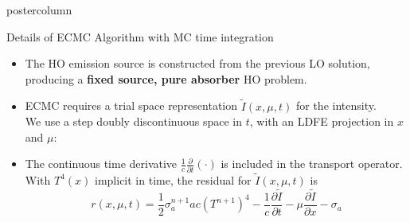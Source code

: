 \documentclass[xcolor=dvipsnames]{beamer}
\newcommand{\pderiv}[2]{\frac{\partial #1}{\partial #2}}
\newcommand{\colb}[1]{{\color{blue} #1}}
\begin{document}
\begin{frame}
\begin{columns}
\begin{column}{.49\textwidth}
\begin{beamercolorbox}[center,wd=\textwidth]{postercolumn}
\begin{minipage}[T]{0.95\textwidth}
{%
\begin{block}{Details of ECMC Algorithm with MC time integration}
    \begin{itemize}
        \setlength\itemsep{0.5em}
        \item The HO emission source is constructed from the previous LO
            solution, producing a \textbf{fixed source,
            pure absorber} HO problem. 
        \item ECMC requires a trial space representation $\tilde I(x,\mu,t)$ for the
            intensity. \\  We use a
            \colb{step doubly discontinuous} space in $t$, with an LDFE projection
            in $x$ and $\mu$:
            \vspace{0.1in}
    \begin{center}
    \end{center}
        \item The continuous time derivative $\frac{1}{c}\pderiv{}{t}\left(\cdot\right)$
            is included in the transport operator. With $T^4(x)$ implicit in time, the
            residual for $\tilde I(x,\mu,t)$ is
            \vspace{0.20in}
            \begin{equation*}
                r(x,\mu,t) = \frac{1}{2}\sigma_a^{n+1} a c \left(T^{n+1}\right)^4 -
                \frac{1}{c}\pderiv{\tilde I}{t} - \mu \pderiv{\tilde I}{x} - \sigma_a

\end{equation*}
\end{itemize}
\end{block}}
\end{minipage}
\end{beamercolorbox}
\end{column}
\end{columns}
\end{frame}
\end{document}
